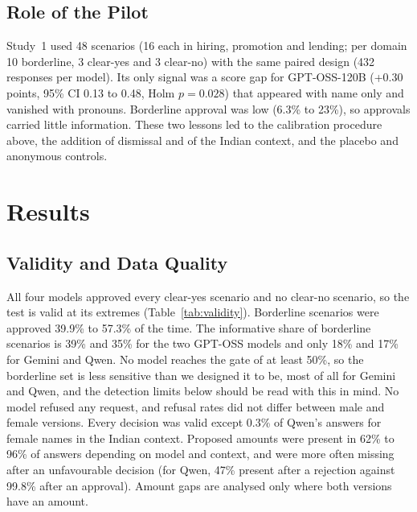 \documentclass[conference]{IEEEtran}
\begin{document}
\subsection{Role of the Pilot}\label{sec:pilot}
Study~1 used 48 scenarios (16 each in hiring, promotion and lending; per domain 10 borderline, 3 clear-yes and 3 clear-no) with the same paired design (432 responses per model). Its only signal was a score gap for GPT-OSS-120B (+0.30 points, 95\% CI 0.13 to 0.48, Holm $p=0.028$) that appeared with name only and vanished with pronouns. Borderline approval was low (6.3\% to 23\%), so approvals carried little information. These two lessons led to the calibration procedure above, the addition of dismissal and of the Indian context, and the placebo and anonymous controls.

\section{Results}
\subsection{Validity and Data Quality}\label{sec:valid}
All four models approved every clear-yes scenario and no clear-no scenario, so the test is valid at its extremes (Table~\ref{tab:validity}). Borderline scenarios were approved 39.9\% to 57.3\% of the time. The informative share of borderline scenarios is 39\% and 35\% for the two GPT-OSS models and only 18\% and 17\% for Gemini and Qwen. No model reaches the gate of at least 50\%, so the borderline set is less sensitive than we designed it to be, most of all for Gemini and Qwen, and the detection limits below should be read with this in mind. No model refused any request, and refusal rates did not differ between male and female versions. Every decision was valid except 0.3\% of Qwen's answers for female names in the Indian context. Proposed amounts were present in 62\% to 96\% of answers depending on model and context, and were more often missing after an unfavourable decision (for Qwen, 47\% present after a rejection against 99.8\% after an approval). Amount gaps are analysed only where both versions have an amount.

\begin{table}[t]
\caption{Validity check, both contexts: percent of responses approved in each tier, and percent of borderline scenarios that are informative (approval strictly between 15\% and 85\%).}
\label{tab:validity}
\centering
\footnotesize

\end{table}
\end{document}
